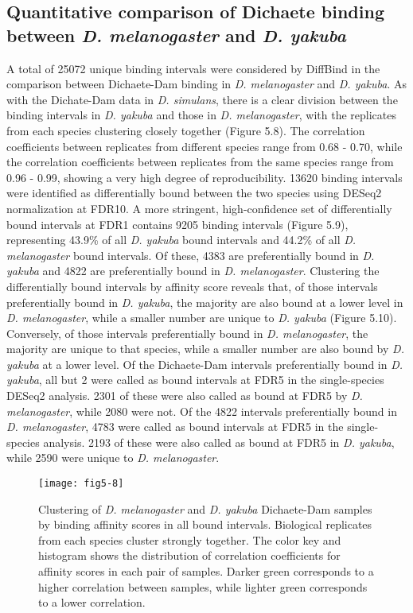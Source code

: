 \subsection{Quantitative comparison of Dichaete binding between \emph{D. melanogaster} and \emph{D. yakuba}}
A total of 25072 unique binding intervals were considered by DiffBind in the comparison between Dichaete-Dam binding in \emph{D. melanogaster} and \emph{D. yakuba}. As with the Dichate-Dam data in \emph{D. simulans}, there is a clear division between the binding intervals in \emph{D. yakuba} and those in \emph{D. melanogaster}, with the replicates from each species clustering closely together (Figure 5.8). The correlation coefficients between replicates from different species range from 0.68 - 0.70, while the correlation coefficients between replicates from the same species range from 0.96 - 0.99, showing a very high degree of reproducibility. 13620 binding intervals were identified as differentially bound between the two species using DESeq2 normalization at FDR10. A more stringent, high-confidence set of differentially bound intervals at FDR1 contains 9205 binding intervals (Figure 5.9), representing 43.9\% of all \emph{D. yakuba} bound intervals and 44.2\% of all \emph{D. melanogaster} bound intervals. Of these, 4383 are preferentially bound in \emph{D. yakuba} and 4822 are preferentially bound in \emph{D. melanogaster}. Clustering the differentially bound intervals by affinity score reveals that, of those intervals preferentially bound in \emph{D. yakuba}, the majority are also bound at a lower level in \emph{D. melanogaster}, while a smaller number are unique to \emph{D. yakuba} (Figure 5.10). Conversely, of those intervals preferentially bound in \emph{D. melanogaster}, the majority are unique to that species, while a smaller number are also bound by \emph{D. yakuba} at a lower level. Of the Dichaete-Dam intervals preferentially bound in \emph{D. yakuba}, all but 2 were called as bound intervals at FDR5 in the single-species DESeq2 analysis. 2301 of these were also called as bound at FDR5 by \emph{D. melanogaster}, while 2080 were not. Of the 4822 intervals preferentially bound in \emph{D. melanogaster}, 4783 were called as bound intervals at FDR5 in the single-species analysis. 2193 of these were also called as bound at FDR5 in \emph{D. yakuba}, while 2590 were unique to \emph{D. melanogaster}.

\begin{figure}
\centering
\texttt{[image: fig5-8]}
\caption{Clustering of \emph{D. melanogaster} and \emph{D. yakuba} Dichaete-Dam samples by binding affinity scores in all bound intervals. Biological replicates from each species cluster strongly together. The color key and histogram shows the distribution of correlation coefficients for affinity scores in each pair of samples. Darker green corresponds to a higher correlation between samples, while lighter green corresponds to a lower correlation.}
\label{Figure 5.8}
\end{figure}

